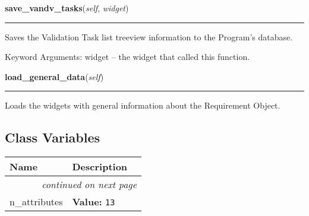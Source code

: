 \hspace{.8\funcindent}\begin{boxedminipage}{\funcwidth}

    \raggedright \textbf{save\_vandv\_tasks}(\textit{self}, \textit{widget})

    \vspace{-1.5ex}

    \rule{\textwidth}{0.5\fboxrule}
\setlength{\parskip}{2ex}
    Saves the Validation Task list treeview information to the Program's 
    database.

    Keyword Arguments: widget -- the widget that called this function.

\setlength{\parskip}{1ex}
    \end{boxedminipage}

    \label{reliafree:requirement:Requirement:load_general_data}

    \vspace{0.5ex}

\hspace{.8\funcindent}\begin{boxedminipage}{\funcwidth}

    \raggedright \textbf{load\_general\_data}(\textit{self})

    \vspace{-1.5ex}

    \rule{\textwidth}{0.5\fboxrule}
\setlength{\parskip}{2ex}
    Loads the widgets with general information about the Requirement 
    Object.

\setlength{\parskip}{1ex}
    \end{boxedminipage}



  \subsection{Class Variables}

    \vspace{-1cm}
\hspace{\varindent}\begin{longtable}{|p{\varnamewidth}|p{\vardescrwidth}|l}
\cline{1-2}
\cline{1-2} \centering \textbf{Name} & \centering \textbf{Description}& \\
\cline{1-2}
\endhead\cline{1-2}\multicolumn{3}{r}{\small\textit{continued on next page}}\\\endfoot\cline{1-2}
\endlastfoot\raggedright n\-\_\-a\-t\-t\-r\-i\-b\-u\-t\-e\-s\- & \raggedright \textbf{Value:} 
{\tt 13}&\\
\cline{1-2}
\end{longtable}

